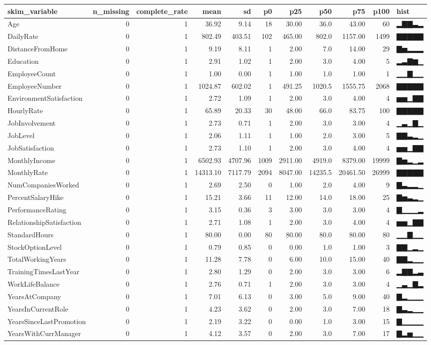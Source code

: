 \documentclass[
]{article}
\begin{document}
\begin{longtable}[]{@{}lrrrrrrrrrl@{}}
\toprule
skim\_variable & n\_missing & complete\_rate & mean & sd & p0 & p25 &
p50 & p75 & p100 & hist\tabularnewline
\midrule
\endhead
Age & 0 & 1 & 36.92 & 9.14 & 18 & 30.00 & 36.0 & 43.00 & 60 &
▂▇▇▃▂\tabularnewline
DailyRate & 0 & 1 & 802.49 & 403.51 & 102 & 465.00 & 802.0 & 1157.00 &
1499 & ▇▇▇▇▇\tabularnewline
DistanceFromHome & 0 & 1 & 9.19 & 8.11 & 1 & 2.00 & 7.0 & 14.00 & 29 &
▇▅▂▂▂\tabularnewline
Education & 0 & 1 & 2.91 & 1.02 & 1 & 2.00 & 3.0 & 4.00 & 5 &
▂▃▇▆▁\tabularnewline
EmployeeCount & 0 & 1 & 1.00 & 0.00 & 1 & 1.00 & 1.0 & 1.00 & 1 &
▁▁▇▁▁\tabularnewline
EmployeeNumber & 0 & 1 & 1024.87 & 602.02 & 1 & 491.25 & 1020.5 &
1555.75 & 2068 & ▇▇▇▇▇\tabularnewline
EnvironmentSatisfaction & 0 & 1 & 2.72 & 1.09 & 1 & 2.00 & 3.0 & 4.00 &
4 & ▅▅▁▇▇\tabularnewline
HourlyRate & 0 & 1 & 65.89 & 20.33 & 30 & 48.00 & 66.0 & 83.75 & 100 &
▇▇▇▇▇\tabularnewline
JobInvolvement & 0 & 1 & 2.73 & 0.71 & 1 & 2.00 & 3.0 & 3.00 & 4 &
▁▃▁▇▁\tabularnewline
JobLevel & 0 & 1 & 2.06 & 1.11 & 1 & 1.00 & 2.0 & 3.00 & 5 &
▇▇▃▂▁\tabularnewline
JobSatisfaction & 0 & 1 & 2.73 & 1.10 & 1 & 2.00 & 3.0 & 4.00 & 4 &
▅▅▁▇▇\tabularnewline
MonthlyIncome & 0 & 1 & 6502.93 & 4707.96 & 1009 & 2911.00 & 4919.0 &
8379.00 & 19999 & ▇▅▂▁▂\tabularnewline
MonthlyRate & 0 & 1 & 14313.10 & 7117.79 & 2094 & 8047.00 & 14235.5 &
20461.50 & 26999 & ▇▇▇▇▇\tabularnewline
NumCompaniesWorked & 0 & 1 & 2.69 & 2.50 & 0 & 1.00 & 2.0 & 4.00 & 9 &
▇▃▂▂▁\tabularnewline
PercentSalaryHike & 0 & 1 & 15.21 & 3.66 & 11 & 12.00 & 14.0 & 18.00 &
25 & ▇▅▃▂▁\tabularnewline
PerformanceRating & 0 & 1 & 3.15 & 0.36 & 3 & 3.00 & 3.0 & 3.00 & 4 &
▇▁▁▁▂\tabularnewline
RelationshipSatisfaction & 0 & 1 & 2.71 & 1.08 & 1 & 2.00 & 3.0 & 4.00 &
4 & ▅▅▁▇▇\tabularnewline
StandardHours & 0 & 1 & 80.00 & 0.00 & 80 & 80.00 & 80.0 & 80.00 & 80 &
▁▁▇▁▁\tabularnewline
StockOptionLevel & 0 & 1 & 0.79 & 0.85 & 0 & 0.00 & 1.0 & 1.00 & 3 &
▇▇▁▂▁\tabularnewline
TotalWorkingYears & 0 & 1 & 11.28 & 7.78 & 0 & 6.00 & 10.0 & 15.00 & 40
& ▇▇▂▁▁\tabularnewline
TrainingTimesLastYear & 0 & 1 & 2.80 & 1.29 & 0 & 2.00 & 3.0 & 3.00 & 6
& ▂▇▇▂▃\tabularnewline
WorkLifeBalance & 0 & 1 & 2.76 & 0.71 & 1 & 2.00 & 3.0 & 3.00 & 4 &
▁▃▁▇▂\tabularnewline
YearsAtCompany & 0 & 1 & 7.01 & 6.13 & 0 & 3.00 & 5.0 & 9.00 & 40 &
▇▂▁▁▁\tabularnewline
YearsInCurrentRole & 0 & 1 & 4.23 & 3.62 & 0 & 2.00 & 3.0 & 7.00 & 18 &
▇▃▂▁▁\tabularnewline
YearsSinceLastPromotion & 0 & 1 & 2.19 & 3.22 & 0 & 0.00 & 1.0 & 3.00 &
15 & ▇▁▁▁▁\tabularnewline
YearsWithCurrManager & 0 & 1 & 4.12 & 3.57 & 0 & 2.00 & 3.0 & 7.00 & 17
& ▇▂▅▁▁\tabularnewline
\bottomrule
\end{longtable}
\end{document}
